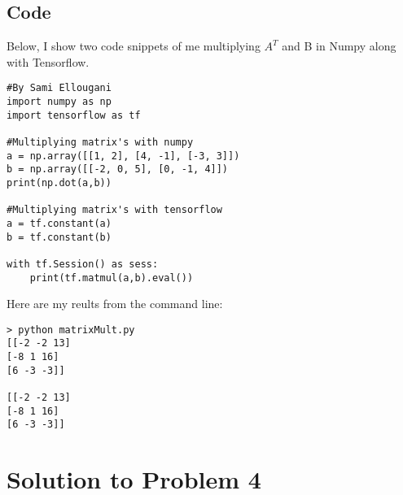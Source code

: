 \documentclass[a4paper]{article}
\begin{document}
\break
\subsection{Code}
Below, I show two code snippets of me multiplying $A^T$ and B in Numpy along with Tensorflow.

\begin{lstlisting}[frame=single]
#By Sami Ellougani
import numpy as np
import tensorflow as tf

#Multiplying matrix's with numpy
a = np.array([[1, 2], [4, -1], [-3, 3]])
b = np.array([[-2, 0, 5], [0, -1, 4]])
print(np.dot(a,b))

#Multiplying matrix's with tensorflow
a = tf.constant(a)
b = tf.constant(b)

with tf.Session() as sess:
	print(tf.matmul(a,b).eval())
\end{lstlisting}
Here are my reults from the command line:

\begin{lstlisting}
> python matrixMult.py
[[-2 -2 13]
[-8 1 16]
[6 -3 -3]]

[[-2 -2 13]
[-8 1 16]
[6 -3 -3]]
\end{lstlisting}

\section{Solution to Problem 4}
\end{document}
